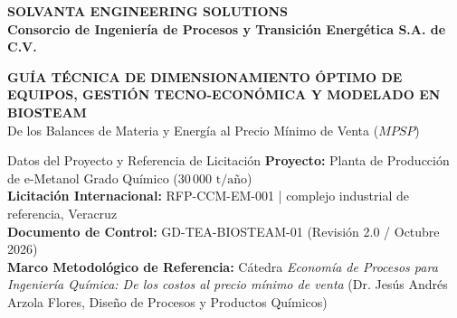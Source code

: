 \documentclass[11pt,letterpaper]{article}
\begin{document}
\begin{titlepage}
    \centering
    \vspace*{0.5cm}
    
    {\Huge\bfseries\color{primaryblue}SOLVANTA ENGINEERING SOLUTIONS}\\[0.3cm]
    {\large\bfseries\color{secondaryblue}Consorcio de Ingeniería de Procesos y Transición Energética S.A. de C.V.}\\[0.8cm]
    
    \begin{tcolorbox}[enhanced,colback=primaryblue,colframe=primaryblue,arc=4pt,boxsep=6pt,center]
        \centering
        {\huge\bfseries\color{white}GUÍA TÉCNICA DE DIMENSIONAMIENTO ÓPTIMO DE EQUIPOS, GESTIÓN TECNO-ECONÓMICA Y MODELADO EN BIOSTEAM}\\[0.3cm]
        {\large\color{accentteal}De los Balances de Materia y Energía al Precio Mínimo de Venta ($MPSP$)}
    \end{tcolorbox}
    
    \vspace{0.6cm}
    
    \begin{conceptbox}{Datos del Proyecto y Referencia de Licitación}
        \textbf{Proyecto:} Planta de Producción de e-Metanol Grado Químico ($30\,000\text{ t/año}$)\\[2pt]
        \textbf{Licitación Internacional:} RFP-CCM-EM-001 | complejo industrial de referencia, Veracruz\\[2pt]
        \textbf{Documento de Control:} GD-TEA-BIOSTEAM-01 (Revisión 2.0 / Octubre 2026)\\[2pt]
        \textbf{Marco Metodológico de Referencia:} Cátedra \textit{Economía de Procesos para Ingeniería Química: De los costos al precio mínimo de venta} (Dr. Jesús Andrés Arzola Flores, Diseño de Procesos y Productos Químicos)
    \end{conceptbox}
    
    \vspace{0.6cm}
    

\end{titlepage}
\end{document}
